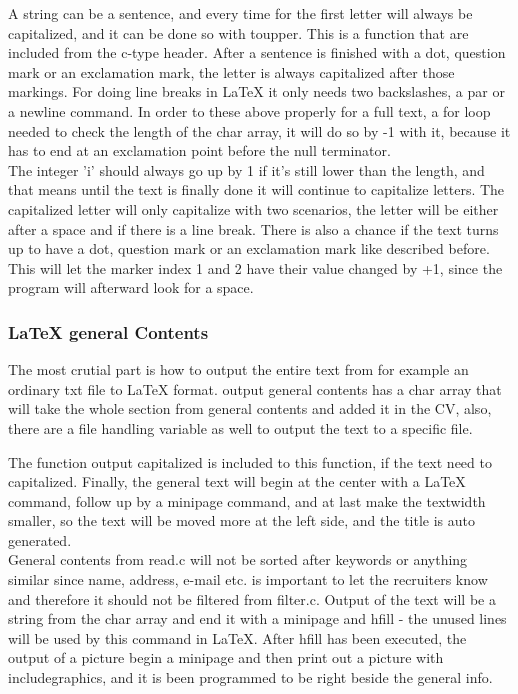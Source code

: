 A string can be a sentence, and every time for the first letter will always be capitalized,
and it can be done so with toupper.
This is a function that are included from the c-type header.
After a sentence is finished with a dot, question mark or an exclamation mark, 
the letter is always capitalized after those markings.
For doing line breaks in LaTeX it only needs two backslashes, a par or a newline command. 
In order to these above properly for a full text, a for loop needed to check the length of the char array,
it will do so by -1 with it, because it has to end at an exclamation point before the null terminator.\\

The integer 'i' should always go up by 1 if it's still lower than the length, 
and that means until the text is finally done 
it will continue to capitalize letters. The capitalized letter will only capitalize with two scenarios, 
the letter will be either after a space and if there is a line break.
There is also a chance if the text turns up to have a dot, question mark or an exclamation mark like described before.
This will let the marker index 1 and 2 have their value changed by +1, since the program will afterward look for a space.\\

\subsubsection{LaTeX general Contents}
The most crutial part is how to output the entire text from for example an ordinary txt file to LaTeX format.
output general contents has a char array that will take the whole section from general contents and added it in the CV,
also, there are a file handling variable as well to output the text to a specific file. 

The function output capitalized is included to this function, if the text need to capitalized.
Finally, the general text will begin at the center with a LaTeX command, follow up by a minipage command, 
and at last make the textwidth smaller, so the text will be moved more at the left side, and the title is auto generated. \\

General contents from read.c will not be sorted after keywords or anything similar 
since name, address, e-mail etc. is important to let the recruiters know and therefore it should not be filtered from filter.c.
Output of the text will be a string from the char array 
and end it with a minipage and hfill - the unused lines will be used by this command in LaTeX.
After hfill has been executed, the output of a picture begin a minipage 
and then print out a picture with includegraphics, and it is been programmed to be right beside the general info. 

